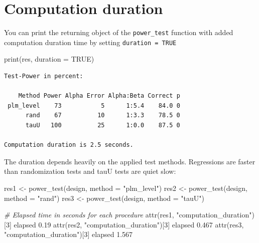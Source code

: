 \documentclass[
]{book}
\newenvironment{Shaded}{\begin{snugshade}}{\end{snugshade}}
\newcommand{\AttributeTok}[1]{\textcolor[rgb]{0.77,0.63,0.00}{#1}}
\newcommand{\CommentTok}[1]{\textcolor[rgb]{0.56,0.35,0.01}{\textit{#1}}}
\newcommand{\ConstantTok}[1]{\textcolor[rgb]{0.00,0.00,0.00}{#1}}
\newcommand{\DecValTok}[1]{\textcolor[rgb]{0.00,0.00,0.81}{#1}}
\newcommand{\FloatTok}[1]{\textcolor[rgb]{0.00,0.00,0.81}{#1}}
\newcommand{\FunctionTok}[1]{\textcolor[rgb]{0.00,0.00,0.00}{#1}}
\newcommand{\NormalTok}[1]{#1}
\newcommand{\OtherTok}[1]{\textcolor[rgb]{0.56,0.35,0.01}{#1}}
\newcommand{\StringTok}[1]{\textcolor[rgb]{0.31,0.60,0.02}{#1}}
\begin{document}
\hypertarget{computation-duration}{%
\section{Computation duration}\label{computation-duration}}

You can print the returning object of the \texttt{power\_test} function with added computation duration time by setting \texttt{duration\ =\ TRUE}

\begin{Shaded}
\begin{Highlighting}[]
\FunctionTok{print}\NormalTok{(res, }\AttributeTok{duration =} \ConstantTok{TRUE}\NormalTok{)}
\end{Highlighting}
\end{Shaded}

\begin{verbatim}
Test-Power in percent:

    Method Power Alpha Error Alpha:Beta Correct p
 plm_level    73           5      1:5.4    84.0 0
      rand    67          10      1:3.3    78.5 0
      tauU   100          25      1:0.0    87.5 0

Computation duration is 2.5 seconds.
\end{verbatim}

The duration depends heavily on the applied test methods. Regressions are faster than randomization tests and tauU tests are quiet slow:

\begin{Shaded}
\begin{Highlighting}[]
\NormalTok{res1 }\OtherTok{\textless{}{-}} \FunctionTok{power\_test}\NormalTok{(design, }\AttributeTok{method =} \StringTok{"plm\_level"}\NormalTok{)}
\NormalTok{res2 }\OtherTok{\textless{}{-}} \FunctionTok{power\_test}\NormalTok{(design, }\AttributeTok{method =} \StringTok{"rand"}\NormalTok{)}
\NormalTok{res3 }\OtherTok{\textless{}{-}} \FunctionTok{power\_test}\NormalTok{(design, }\AttributeTok{method =} \StringTok{"tauU"}\NormalTok{)}

\CommentTok{\# Elapsed time in seconds for each procedure}
\FunctionTok{attr}\NormalTok{(res1, }\StringTok{"computation\_duration"}\NormalTok{)[}\DecValTok{3}\NormalTok{]}
\NormalTok{elapsed }
   \FloatTok{0.19} 
\FunctionTok{attr}\NormalTok{(res2, }\StringTok{"computation\_duration"}\NormalTok{)[}\DecValTok{3}\NormalTok{]}
\NormalTok{elapsed }
  \FloatTok{0.467} 
\FunctionTok{attr}\NormalTok{(res3, }\StringTok{"computation\_duration"}\NormalTok{)[}\DecValTok{3}\NormalTok{]}
\NormalTok{elapsed }
  \FloatTok{1.567} 
\end{Highlighting}
\end{Shaded}
\end{document}
